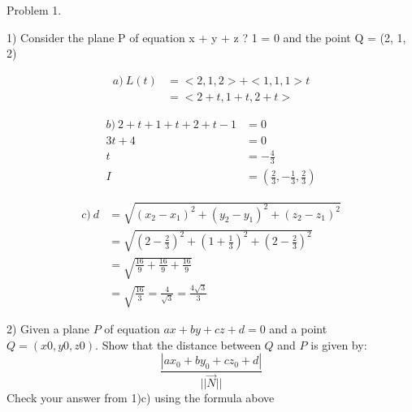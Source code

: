 \documentclass{article}
\begin{document}
\begin{text}
Problem 1. \\
\end{text}

\begin{text}
1) Consider the plane P of equation x + y + z ? 1 = 0 and the point Q = (2, 1, 2)
\end{text}

\begin{align*}
a) \: L(t) &= < 2, 1, 2 > + < 1, 1, 1 >t \\
&= < 2 + t, 1 + t, 2 + t >
\end{align*}

\begin{align*}
b) \: 2 + t + 1 + t + 2 + t -1 &= 0 \\
3t + 4 &= 0 \\
t &= -\frac{4}{3} \\
I &= (\frac{2}{3}, -\frac{1}{3}, \frac{2}{3})
\end{align*}

\begin{align*}
c) \: d &= \sqrt{(x_2 - x_1)^2 + (y_2 - y_1)^2 + (z_2 - z_1)^2} \\
&= \sqrt{(2 - \frac{2}{3})^2 + (1 + \frac{1}{3})^2 + (2 - \frac{2}{3})^2} \\
&= \sqrt{\frac{16}{9} + \frac{16}{9} + \frac{16}{9}} \\
&= \sqrt{\frac{16}{3}} = \frac{4}{\sqrt{3}} = \frac{4\sqrt{3}}{3}
\end{align*}

\begin{text}
2) Given a plane $P$ of equation $ax + by + cz + d = 0$ and a point $Q = (x0, y0, z0)$.
Show that the distance between $Q$ and $P$ is given by:
$$
\frac{|ax_0 + by_0 + cz_0 + d|}{||\vec{N}||}
$$
Check your answer from 1)c) using the formula above
\end{text}
\end{document}

